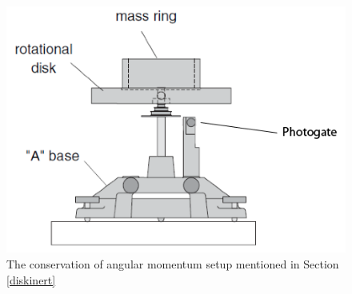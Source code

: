 \begin{figure}[h]
	\begin{center}
		\includegraphics[width=0.6\linewidth]{./Exp7/pic/othersetup.png}
	\end{center}
	\caption{The conservation of angular momentum setup mentioned in Section \ref{diskinert}}
	\label{fig:rotinert}
\end{figure}

